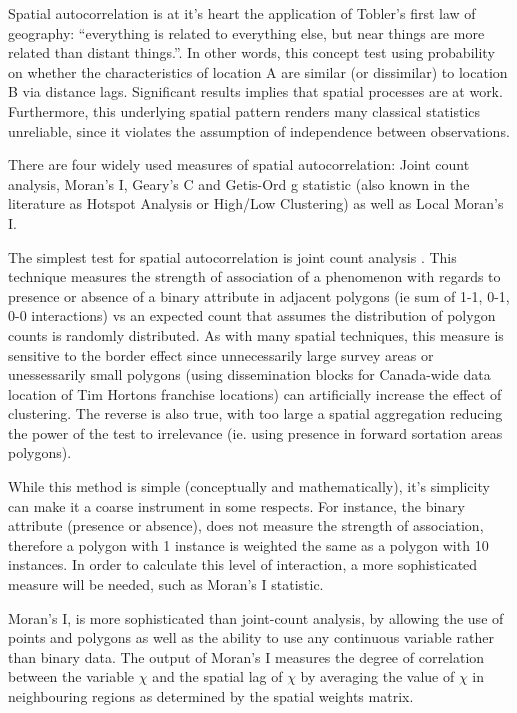 \documentclass[12pt,letterpaper,notitlepage,onecolumn,final,openbib]{article}
\begin{document}
Spatial autocorrelation is at it's heart the application of Tobler's first law of geography: ``everything is related to everything else, but near things are more related than distant things.''\cite[page  236]{toblera1970}.  In other words, this concept test using probability on whether the characteristics of location A are similar (or dissimilar) to location B via distance lags.   Significant results implies that spatial processes are at work.  Furthermore, this underlying spatial pattern renders many classical statistics unreliable, since it violates the assumption of independence between observations\cite{fischer2009handbook}. 

There are four widely used measures of spatial autocorrelation: Joint count analysis, Moran's I, Geary's C and Getis-Ord g statistic (also known in the literature as Hotspot Analysis or High/Low Clustering) as well as Local Moran's I.  

The simplest test for spatial autocorrelation is joint count analysis \cite{LeeWong2001}. This technique measures the strength of association of a phenomenon with regards to presence or absence of a binary attribute in adjacent polygons (ie sum of 1-1, 0-1, 0-0 interactions) vs an expected count that assumes the distribution of polygon counts is randomly distributed. As with many spatial techniques, this measure is sensitive to the border effect since unnecessarily large survey areas or unessessarily small polygons (using dissemination blocks for Canada-wide data location of Tim Hortons franchise locations) can artificially increase the effect of clustering.  The reverse is also true, with too large a spatial aggregation reducing the power of the test to irrelevance (ie. using presence in forward sortation areas polygons).   

While this method is simple (conceptually and mathematically), it's simplicity can make it a coarse instrument in some respects.  For instance, the binary attribute (presence or absence), does not measure the strength of association, therefore a polygon with 1 instance is weighted the same as a polygon with 10 instances.  In order to calculate this level of interaction, a more sophisticated measure will be needed, such as Moran's I statistic.  

Moran's I, is more sophisticated than joint-count analysis, by allowing the use of points and  polygons as well as the ability to use any continuous variable rather than binary data.  The output of Moran's I measures the degree of correlation between the variable $\chi$ and the spatial lag of $\chi$ by averaging the value of $\chi$ in neighbouring regions as determined by the spatial weights matrix. 
\end{document}
